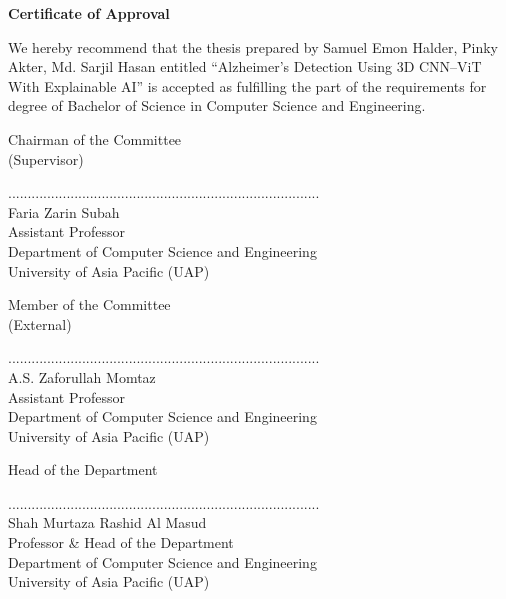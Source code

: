 \newpage
    \begin{center}
    
        \vspace*{0.1cm}
        \large
        
        
        \large
        \textbf{Certificate of Approval}\\
        \vspace{0.5cm}
        
    \end{center}
\noindent
{\large We hereby recommend that the thesis prepared by Samuel Emon Halder, Pinky Akter, Md. Sarjil Hasan entitled “Alzheimer's Detection Using 3D CNN–ViT With Explainable AI” is accepted as fulfilling the part of the requirements for degree of Bachelor of Science in Computer Science and Engineering.} 
\vspace{0.5cm}


\begin{flushright}
\vspace{1cm}
Chairman of the Committee
\\(Supervisor)
\end{flushright}
\vspace{-3cm}
................................................................................\\
Faria Zarin Subah  
\\Assistant Professor
\\Department of Computer Science and Engineering
\\University of Asia Pacific (UAP)

\vspace{0.5cm}
\begin{flushright}
\vspace{1cm}
Member of the Committee
\\(External)
\end{flushright}
\vspace{-3cm}
................................................................................\\
A.S. Zaforullah Momtaz  
\\Assistant Professor
\\Department of Computer Science and Engineering
\\University of Asia Pacific (UAP)

\vspace{1cm}
\begin{flushright}
Head of the Department
\end{flushright}
\vspace{-2.5cm}
................................................................................\\
Shah Murtaza Rashid Al Masud  
\\Professor \& Head of the Department
\\Department of Computer Science and Engineering
\\University of Asia Pacific (UAP)
